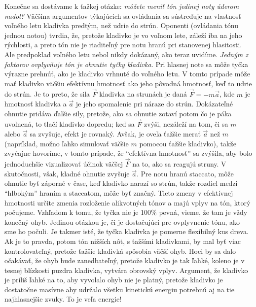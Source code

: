 Konečne sa dostávame k ťažkej otázke: \emph{môžete meniť tón jedinej noty úderom nadol?} Väčšina argumentov týkajúcich sa ovládania sa sústreďuje na vlastnosť voľného letu kladivka predtým, než udrie do strún. Oponenti (ovládania tónu jednou notou) tvrdia, že, pretože kladivko je vo voľnom lete, záleží iba na jeho rýchlosti, a preto tón nie je riaditeľný pre notu hranú pri stanovenej hlasitosti. Ale predpoklad voľného letu nebol nikdy dokázaný, ako teraz uvidíme. \emph{Jedným z faktorov ovplyvňuje tón je ohnutie tyčky kladivka.} Pri hlasnej note sa môže tyčka výrazne prehnúť, ako je kladivko vrhnuté do voľného letu. V tomto prípade môže mať kladivko väčšiu efektívnu hmotnosť ako jeho pôvodná hmotnosť, keď to udrie do strún. Je to preto, že sila $\vec{F}$ kladivka na strunách je daná $\vec{F} =-m\vec{a}$, kde $m$ je hmotnosť kladivka a $\vec{a}$ je jeho spomalenie pri náraze do strún. Dokázateľné ohnutie pridáva ďalšie sily, pretože, ako sa ohnutie zotaví potom čo je páka uvoľnená, to tlačí kladivko dopredu; keď sa $\vec{F}$ zvýši, nezáleží na tom, či sa $m$ alebo $\vec{a}$ sa zvyšuje, efekt je rovnaký. Avšak, je oveľa ťažšie merať $\vec{a}$ než $m$ (napríklad, možno ľahko simulovať väčšie $m$ pomocou ťažšie kladivko), takže zvyčajne hovoríme, v tomto prípade, že “efektívna hmotnosť” sa zvýšila, aby bolo jednoduchšie vizualizovať účinok väčšej $\vec{F}$ na to, ako sa reagujú struny. V skutočnosti, však, kladné ohnutie zvyšuje $\vec{a}$. Pre notu hranú staccato, môže ohnutie byť záporné v čase, keď kladivko narazí so strún, takže rozdiel medzi “hlbokým” hraním a staccatom, môže byť značný. Tieto zmeny v efektívnej hmotnosti určite zmenia rozloženie alikvotných tónov a majú vplyv na tón, ktorý počujeme. Vzhľadom k tomu, že tyčka nie je 100\% pevná, vieme, že tam je vždy konečný ohyb. Jedinou otázkou je, či je dostačujúci pre ovplyvnenie tónu, ako sme ho počuli. Je takmer isté, že tyčka kladivka je pomerne flexibilný kus dreva. Ak je to pravda, potom tón nižších nôt, s ťažšími kladivkami, by mal byť viac kontrolovateľný, pretože ťažšie kladivká spôsobia väčší ohyb. Hoci by sa dalo očakávať, že ohyb bude zanedbateľný, pretože kladivko je tak ľahké, koleno je v tesnej blízkosti puzdra kladivka, vytvára obrovský vplyv. Argument, že kladivko je príliš ľahké na to, aby vyvolalo ohyb nie je platný, pretože kladivko je dostatočne masívne aby udržalo všetku kinetickú energiu potrebnú aj na tie najhlasnejšie zvuky. To je veľa energie!

